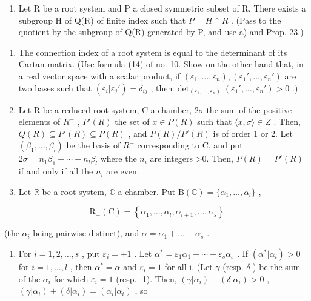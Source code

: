 \begin{enumerate}
\def\labelenumi{\alph{enumi})}
\setcounter{enumi}{1}
\tightlist
\item
  Let R be a root system and P a closed symmetric subset of R. There exists a subgroup H of Q(R) of finite index such that \(P = H \cap R\) . (Pass to the quotient by the subgroup of Q(R) generated by P, and use a) and Prop. 23.)
\end{enumerate}

\begin{enumerate}
\def\labelenumi{\arabic{enumi})}
\setcounter{enumi}{6}
\item
  The connection index of a root system is equal to the determinant of its Cartan matrix. (Use formula (14) of no. 10. Show on the other hand that, in a real vector space with a scalar product, if \((\varepsilon_1, \ldots, \varepsilon_n), (\varepsilon_1', \ldots, \varepsilon_n')\) are two bases such that \((\varepsilon_i | \varepsilon_j') = \delta_{ij}\) , then \(\det_{(\varepsilon_1, \ldots, \varepsilon_n)} (\varepsilon_1', \ldots, \varepsilon_n') > 0\) .)
\item
  Let R be a reduced root system, C a chamber, \(2\sigma\) the sum of the positive elements of \(R^{-}\) , \(P'(R)\) the set of \(x \in P(R)\) such that \(\langle x, \sigma \rangle \in Z\) . Then, \(Q(R) \subseteq P'(R) \subseteq P(R)\) , and \(P(R)/P'(R)\) is of order 1 or 2. Let \((\beta_{1}, \ldots, \beta_{l})\) be the basis of \(R^{-}\) corresponding to C, and put \(2\sigma = n_{1}\beta_{1} + \cdots + n_{l}\beta_{l}\) where the \(n_{i}\) are integers \textgreater0. Then, \(P(R) = P'(R)\) if and only if all the \(n_{i}\) are even.
\item
  Let \(\mathbb{R}\) be a root system, \(\mathbb{C}\) a chamber. Put \(\mathrm{B}(\mathbb{C}) = \{\alpha_1, \ldots, \alpha_l\}\) ,
\end{enumerate}

\[
\mathrm{R} _ {+} (\mathrm{C}) = \left\{\alpha_ {1}, \dots , \alpha_ {l}, \alpha_ {l + 1}, \dots , \alpha_ {s} \right\}
\]

(the \(\alpha_{i}\) being pairwise distinct), and \(\alpha = \alpha_{1} + \dots +\alpha_{s}\) .

\begin{enumerate}
\def\labelenumi{\alph{enumi})}
\tightlist
\item
  For \(i = 1, 2, \ldots, s\) , put \(\varepsilon_{i} = \pm 1\) . Let \(\alpha^{*} = \varepsilon_{1}\alpha_{1} + \cdots + \varepsilon_{s}\alpha_{s}\) . If \((\alpha^{*}|\alpha_{i}) > 0\) for \(i = 1, \ldots, l\) , then \(\alpha^{*} = \alpha\) and \(\varepsilon_{i} = 1\) for all i. (Let \(\gamma\) (resp. \(\delta\) ) be the sum of the \(\alpha_{i}\) for which \(\varepsilon_{i} = 1\) (resp. -1). Then, \((\gamma|\alpha_{i}) - (\delta|\alpha_{i}) > 0\) , \((\gamma|\alpha_{i}) + (\delta|\alpha_{i}) = (\alpha_{i}|\alpha_{i})\) , so
\end{enumerate}

